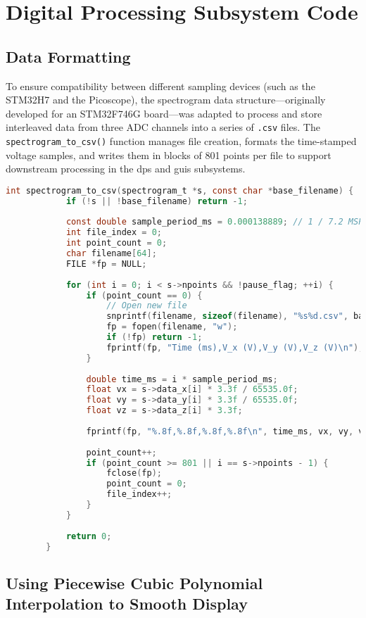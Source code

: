 \documentclass[class=report,11pt,crop=false]{standalone}
\begin{document}
	\section{Digital Processing Subsystem Code}
	
	\subsection{Data Formatting}
	
	To ensure compatibility between different sampling devices (such as the STM32H7 and the Picoscope), the spectrogram data structure—originally developed for an STM32F746G board—was adapted to process and store interleaved data from three ADC channels into a series of \texttt{.csv} files. The \texttt{spectrogram\_to\_csv()} function manages file creation, formats the time-stamped voltage samples, and writes them in blocks of 801 points per file to support downstream processing in the \acrshort{dps} and \acrshort{guis} subsystems.
	
	\begin{lstlisting}[language=C, label={lst:das-csv-file}, caption={Code snippet of the function for storing the interleaved sampling data in a \texttt{.csv}.}]
		int spectrogram_to_csv(spectrogram_t *s, const char *base_filename) {
			if (!s || !base_filename) return -1;
			
			const double sample_period_ms = 0.000138889; // 1 / 7.2 MSPS
			int file_index = 0;
			int point_count = 0;
			char filename[64];
			FILE *fp = NULL;
			
			for (int i = 0; i < s->npoints && !pause_flag; ++i) {
				if (point_count == 0) {
					// Open new file
					snprintf(filename, sizeof(filename), "%s%d.csv", base_filename, file_index);
					fp = fopen(filename, "w");
					if (!fp) return -1;
					fprintf(fp, "Time (ms),V_x (V),V_y (V),V_z (V)\n");
				}
				
				double time_ms = i * sample_period_ms;
				float vx = s->data_x[i] * 3.3f / 65535.0f;
				float vy = s->data_y[i] * 3.3f / 65535.0f;
				float vz = s->data_z[i] * 3.3f;
				
				fprintf(fp, "%.8f,%.8f,%.8f,%.8f\n", time_ms, vx, vy, vz);
				
				point_count++;
				if (point_count >= 801 || i == s->npoints - 1) {
					fclose(fp);
					point_count = 0;
					file_index++;
				}
			}
			
			return 0;
		}
	\end{lstlisting}
	
	\subsection{Using Piecewise Cubic Polynomial Interpolation to Smooth Display}
	
\end{document}
